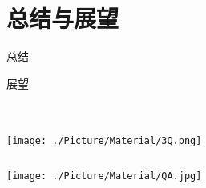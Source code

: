 \documentclass[xcolor=table,notheorems,compress,blue]{beamer}
\begin{document}
\section{总结与展望}	
\begin{frame}{总结}
	
\end{frame}	
\begin{frame}{展望}
	
\end{frame}	


\section{}
\begin{frame}[plain]
	\thispagestyle{empty}
	\begin{columns}
		\begin{column}{\paperwidth}
			\texttt{[image: ./Picture/Material/3Q.png]}
		\end{column}
	\end{columns}
\end{frame}
\begin{frame}[plain]
	\thispagestyle{empty}
	\begin{columns}
		\begin{column}{\paperwidth}
			\texttt{[image: ./Picture/Material/QA.jpg]}
		\end{column}
	\end{columns}
\end{frame}
\end{document}

